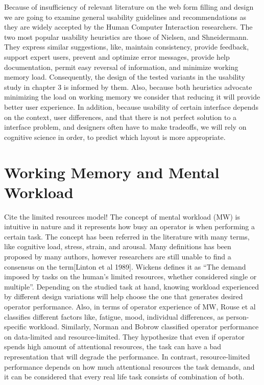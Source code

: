 \documentclass[a4paper]{report}
\begin{document}
		Because of insufficiency of relevant literature on the web form filling and design we are going to examine general usability guidelines and recommendations as they are widely accepted by the Human Computer Interaction researchers. The two most popular usability heuristics are those of Nielsen\cite{nielsen1990heuristic}, and Shneidermann\cite{shneiderman1992designing}. They express similar suggestions, like, maintain consistency, provide feedback, support expert users, prevent and optimize error messages, provide help documentation, permit easy reversal of information, and minimize working memory load. Consequently, the design of the tested variants in the usability study in chapter 3 is informed by them. Also, because both heuristics advocate minimizing the load on working memory we consider that reducing it will provide better user experience. In addition, because usability of certain interface depends on the context, user differences, and that there is not perfect solution to a interface problem, and designers often have to make tradeoffs\cite{norman1986user}, we will rely on cognitive science in order, to predict which layout is more appropriate.

	\section{Working Memory and Mental Workload}
	Cite the limited resources model!
		The concept of mental workload (MW) is intuitive in nature and it represents how busy an operator is when performing a certain task. The concept has been referred in the literature with many terms, like cognitive load, stress, strain, and arousal. Many definitions has been proposed by many authors, however researchers are still unable to find a consensus on the term[Linton et al 1989]. Wickens\cite{wickens2008multiple} defines it as ``The demand imposed by tasks on the human's limited resources, whether considered single or multiple''. Depending on the studied task at hand, knowing workload experienced by different design variations will help choose the one that generates desired operator performance. Also, in terms of operator experience of MW, Rouse et al classifies different factors like, fatigue, mood, individual differences, as person-specific workload\cite{rouse1993modeling}. Similarly, Norman and Bobrow classified operator performance on data-limited and resource-limited\cite{norman1975data}. They hypothesize that even if operator spends high amount of attentional resources, the task can have a bad representation that will degrade the performance. In contrast, resource-limited performance depends on how much attentional resources the task demands, and it can be considered that every real life task consists of combination of both. 
\end{document}
